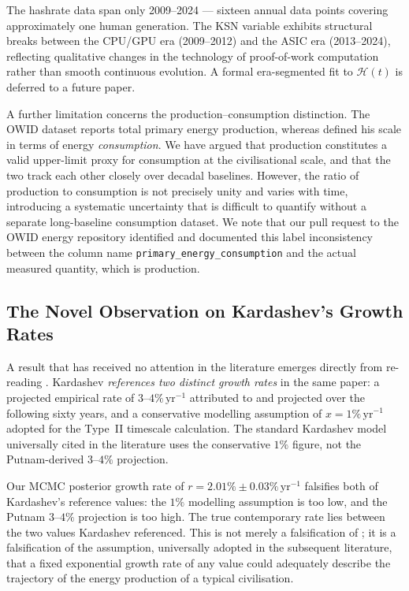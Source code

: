 \documentclass[final,5p,times,twocolumn,authoryear]{elsarticle}
\begin{document}
The hashrate data span only 2009--2024 --- sixteen annual
data points covering approximately one human generation.
The KSN variable exhibits structural breaks between the
CPU/GPU era (2009--2012) and the ASIC era (2013--2024),
reflecting qualitative changes in the technology of
proof-of-work computation rather than smooth continuous
evolution. A formal era-segmented fit to $\mathcal{H}(t)$ is deferred
to a future paper.
 
A further limitation concerns the production--consumption
distinction. The OWID dataset reports total primary energy
production, whereas \citet{kar64} defined his scale in terms
of energy \emph{consumption}. We have argued that production
constitutes a valid upper-limit proxy for consumption at
the civilisational scale, and that the two track each other
closely over decadal baselines. However, the ratio of
production to consumption is not precisely unity and varies
with time, introducing a systematic uncertainty that is
difficult to quantify without a separate long-baseline
consumption dataset. We note that our pull request to the
OWID energy repository \citep{Ritchie2022} identified and
documented this label inconsistency between the column name
\texttt{primary\_energy\_consumption} and the actual measured
quantity, which is production.
 
\subsection{The Novel Observation on Kardashev's Growth Rates}
 
A result that has received no attention in the literature
emerges directly from re-reading \citet{kar64}. Kardashev
\emph{references two distinct growth rates} in the same paper:
a projected empirical rate of $3$--$4\%\,\mathrm{yr}^{-1}$ 
attributed to \citet{Putnam1948} and projected over the following 
sixty years, and a conservative modelling assumption of 
$x = 1\%\,\mathrm{yr}^{-1}$ adopted for the Type~II timescale 
calculation. The standard Kardashev model universally cited 
in the literature \citep{gray2020} uses the conservative $1\%$ 
figure, not the Putnam-derived $3$--$4\%$ projection.
 
Our MCMC posterior growth rate of $r = 2.01\% \pm 0.03\%\,
\mathrm{yr}^{-1}$ falsifies both of Kardashev's reference values: 
the $1\%$ modelling assumption is too low, and the Putnam $3$--$4\%$ 
projection is too high. The true contemporary rate lies between 
the two values Kardashev referenced. This is not merely a 
falsification of \citet{kar64}; it is a falsification of the assumption, 
universally adopted in the subsequent literature, that a fixed 
exponential growth rate of any value could adequately describe 
the trajectory of the energy production of a typical civilisation.
 
\end{document}
